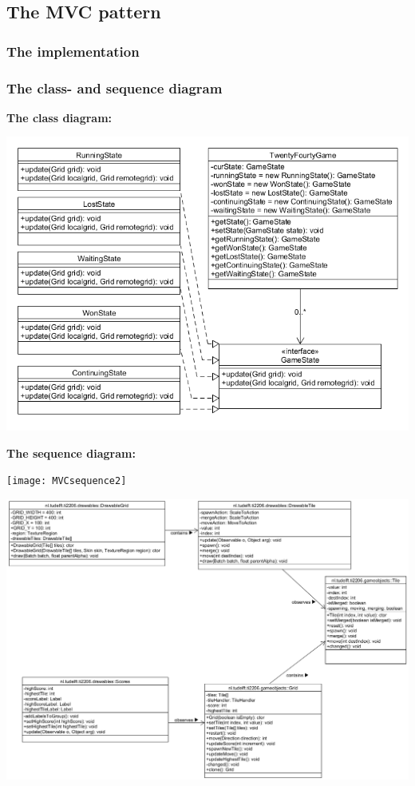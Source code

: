 \documentclass[a4paper,11pt,report]{scrartcl}
\begin{document}
\subsection{The MVC pattern}
\subsubsection{The implementation}

\newpage\subsubsection{The class- and sequence diagram}
\textbf{The class diagram:}\\
\centerline{\includegraphics[scale=0.7]{statePatternUML}}

\newpage\textbf{The sequence diagram:}\\
\centerline{\texttt{[image: MVCsequence2]}}


\centerline{\includegraphics[scale=0.7]{mvcPattern}}
\end{document}
